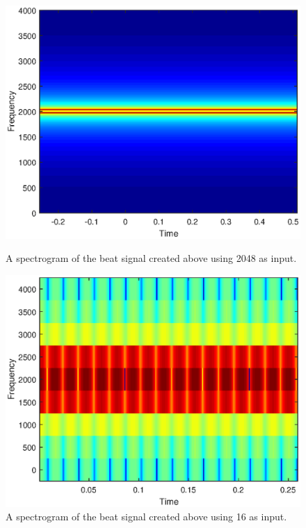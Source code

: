 \documentclass{article}
\begin{document}
\begin{figure}[H]
	\centering
	\begin{minipage}{5cm}		
		\includegraphics[scale=0.4]{fig5}
		\caption{A spectrogram of the beat signal created above using 2048 as input.}
	\end{minipage}
	\hspace{2cm}
	\begin{minipage}{5cm}
		\includegraphics[scale=0.4]{fig6}
		\caption{A spectrogram of the beat signal created above using 16 as input.}
	\end{minipage}
\end{figure}
\end{document}
